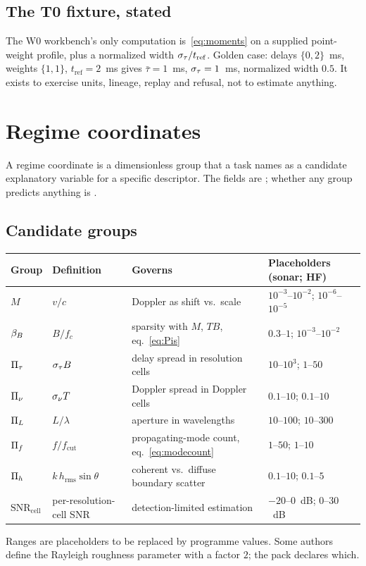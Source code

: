 \subsection{The T0 fixture, stated}

The W0 workbench's only computation is~\eqref{eq:moments} on a supplied point-weight profile, plus a normalized width $\sigma_{\tau}/t_{\mathrm{ref}}$. Golden case: delays $\{0,2\}$~ms, weights $\{1,1\}$, $t_{\mathrm{ref}}=2$~ms gives $\bar\tau=1$~ms, $\sigma_{\tau}=1$~ms, normalized width $0.5$. It exists to exercise units, lineage, replay and refusal, not to estimate anything.

\section{Regime coordinates}
\label{sec:regime}

A regime coordinate is a dimensionless group that a task names as a candidate explanatory variable for a specific descriptor. The fields are \tagG{}; whether any group predicts anything is \tagH{}.

\subsection[Candidate groups]{Candidate groups\hfill{\normalfont\small \tagP{}}}

\begin{center}
\small
\begin{tabular}{@{}llp{6cm}l@{}}
\toprule
Group & Definition & Governs & Placeholders (sonar; HF) \\
\midrule
$M$ & $v/c$ & Doppler as shift vs.\ scale & $10^{-3}$--$10^{-2}$; $10^{-6}$--$10^{-5}$ \\
$\beta_{B}$ & $B/f_c$ & sparsity with $M$, $TB$, eq.~\eqref{eq:Pis} & $0.3$--$1$; $10^{-3}$--$10^{-2}$ \\
$\Pi_{\tau}$ & $\sigma_{\tau} B$ & delay spread in resolution cells & $10$--$10^3$; $1$--$50$ \\
$\Pi_{\nu}$ & $\sigma_{\nu} T$ & Doppler spread in Doppler cells & $0.1$--$10$; $0.1$--$10$ \\
$\Pi_{L}$ & $L/\lambda$ & aperture in wavelengths & $10$--$100$; $10$--$300$ \\
$\Pi_{f}$ & $f/f_{\mathrm{cut}}$ & propagating-mode count, eq.~\eqref{eq:modecount} & $1$--$50$; $1$--$10$ \\
$\Pi_{h}$ & $k\,h_{\mathrm{rms}}\sin\theta$ & coherent vs.\ diffuse boundary scatter & $0.1$--$10$; $0.1$--$5$ \\
$\mathrm{SNR}_{\mathrm{cell}}$ & per-resolution-cell SNR & detection-limited estimation & $-20$--$0$~dB; $0$--$30$~dB \\
\bottomrule
\end{tabular}
\end{center}
Ranges are placeholders to be replaced by programme values. Some authors define the Rayleigh roughness parameter with a factor $2$; the pack declares which.

